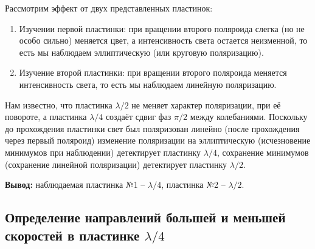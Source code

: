 	Рассмотрим эффект от двух представленных пластинок:
	
	\begin{enumerate}
		\item Изучении первой пластинки: при вращении второго поляроида слегка (но не особо сильно) меняется цвет, а интенсивность света остается неизменной, то есть мы наблюдаем эллиптическую (или круговую поляризацию).
		\item Изучение второй пластинки: при вращении второго поляроида меняется интенсивность света, то есть мы наблюдаем линейную поляризацию.
	\end{enumerate} 

	Нам известно, что пластинка $\lambda/2$ не меняет характер поляризации, при её повороте, а пластинка $\lambda/4$ создаёт сдвиг фаз $\pi/2$ между колебаниями. Поскольку до прохождения пластинки свет был поляризован линейно (после прохождения через первый поляроид) изменение поляризации на эллиптическую (исчезновение минимумов при наблюдении) детектирует пластинку $\lambda/4$, сохранение минимумов (сохранение линейной поляризации) детектирует пластинку $\lambda/2$.
	
	\noindent \textbf{Вывод:} наблюдаемая пластинка №1 -- $\lambda/4$, пластинка №2 -- $\lambda/2$.
	
	\subsection*{Определение направлений большей и меньшей скоростей в пластинке $\lambda/4$}
	
